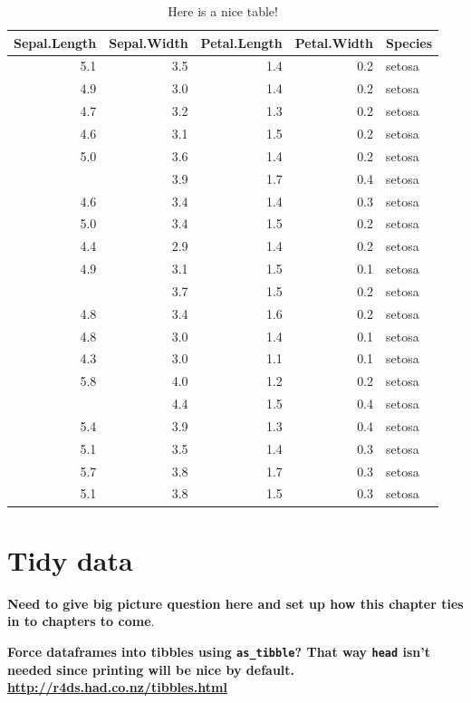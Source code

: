 \documentclass[]{tufte-book}
\begin{document}
\begin{table}

\caption{\label{tab:nice-tab}Here is a nice table!}
\centering
\begin{tabular}[t]{rrrrl}
\toprule
Sepal.Length & Sepal.Width & Petal.Length & Petal.Width & Species\\
\midrule
5.1 & 3.5 & 1.4 & 0.2 & setosa\\
4.9 & 3.0 & 1.4 & 0.2 & setosa\\
4.7 & 3.2 & 1.3 & 0.2 & setosa\\
4.6 & 3.1 & 1.5 & 0.2 & setosa\\
5.0 & 3.6 & 1.4 & 0.2 & setosa\\
\addlinespace
5.4 & 3.9 & 1.7 & 0.4 & setosa\\
4.6 & 3.4 & 1.4 & 0.3 & setosa\\
5.0 & 3.4 & 1.5 & 0.2 & setosa\\
4.4 & 2.9 & 1.4 & 0.2 & setosa\\
4.9 & 3.1 & 1.5 & 0.1 & setosa\\
\addlinespace
5.4 & 3.7 & 1.5 & 0.2 & setosa\\
4.8 & 3.4 & 1.6 & 0.2 & setosa\\
4.8 & 3.0 & 1.4 & 0.1 & setosa\\
4.3 & 3.0 & 1.1 & 0.1 & setosa\\
5.8 & 4.0 & 1.2 & 0.2 & setosa\\
\addlinespace
5.7 & 4.4 & 1.5 & 0.4 & setosa\\
5.4 & 3.9 & 1.3 & 0.4 & setosa\\
5.1 & 3.5 & 1.4 & 0.3 & setosa\\
5.7 & 3.8 & 1.7 & 0.3 & setosa\\
5.1 & 3.8 & 1.5 & 0.3 & setosa\\
\bottomrule
\end{tabular}
\end{table}

\chapter{Tidy data}\label{tidy}

\textbf{Need to give big picture question here and set up how this
chapter ties in to chapters to come}.

\textbf{Force dataframes into tibbles using \texttt{as\_tibble}? That
way \texttt{head} isn't needed since printing will be nice by default.
\url{http://r4ds.had.co.nz/tibbles.html}}
\end{document}
